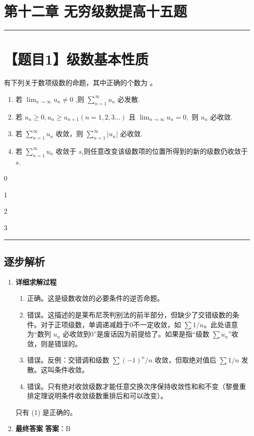 \documentclass[UTF8]{ctexart}
\newenvironment{redenv}{\color{red}}{}
\newenvironment{detailedanalysis}{%
    \color{red}
    \begin{enumerate}[label=\textbf{第\arabic*步：}, leftmargin=*, align=left, itemsep=1.5ex]
}{%
    \end{enumerate}
}
\newcommand{\problemrule}{\noindent\rule{\textwidth}{1.5pt}\vspace{-0.8em}}
\newcommand{\analysisrule}{\noindent\rule{\textwidth}{0.8pt}\vspace{-0.8em}}
\newcommand{\choicesFour}[4]{
    \begin{enumerate}[label=\Alph*., itemsep=0pt, parsep=0pt, topsep=5pt, labelsep=0.5em]
        \begin{minipage}{0.22\linewidth} \item #1 \end{minipage}
        \begin{minipage}{0.22\linewidth} \item #2 \end{minipage}
        \begin{minipage}{0.22\linewidth} \item #3 \end{minipage}
        \begin{minipage}{0.22\linewidth} \item #4 \end{minipage}
    \end{enumerate}
}
\newcommand{\blank}[1]{\underline{\hspace{#1}}}
\begin{document}
\section*{第十二章 无穷级数提高十五题}

\problemrule
\section*{【题目1】级数基本性质}
有下列关于数项级数的命题，其中正确的个数为 \blank{1cm}。
\begin{enumerate}[label=(\arabic*)]
    \item 若 $ \lim_{n\to\infty}u_{n}\neq0 $ ,则 $ \sum_{n=1}^{\infty}u_{n} $ 必发散.
    \item 若 $ u_{n}\geq0,u_{n}\geq u_{n+1}(n=1,2,3\ldots) $ 且 $ \lim_{n\to\infty}u_{n}=0, $ 则 $ u_{n} $ 必收敛.
    \item 若 $ \sum_{n=1}^{\infty}u_{n} $ 收敛，则 $ \sum_{n=1}^{\infty}|u_{n}| $ 必收敛.
    \item 若 $ \sum_{n=1}^{\infty}u_{n} $ 收敛于 $s$,则任意改变该级数项的位置所得到的新的级数仍收敛于 $s$.
\end{enumerate}
\choicesFour{0}{1}{2}{3}

\begin{redenv}
\analysisrule
\subsection*{逐步解析}

\begin{detailedanalysis}
\item \textbf{详细求解过程}
\begin{enumerate}[label=(\arabic*)]
    \item 正确。这是级数收敛的必要条件的逆否命题。
    \item 错误。这描述的是莱布尼茨判别法的前半部分，但缺少了交错级数的条件。对于正项级数，单调递减趋于0不一定收敛，如 $\sum 1/n$。此处语意为“数列 $u_n$ 必收敛到0”是废话因为前提给了。如果是指“级数 $\sum u_n$”收敛，则是错误的。
    \item 错误。反例：交错调和级数 $\sum (-1)^n/n$ 收敛，但取绝对值后 $\sum 1/n$ 发散。这叫条件收敛。
    \item 错误。只有绝对收敛级数才能任意交换次序保持收敛性和和不变（黎曼重排定理说明条件收敛级数重排后和可以改变）。
\end{enumerate}
只有 (1) 是正确的。

\item \textbf{最终答案}
\textbf{答案}：B
\end{detailedanalysis}
\end{redenv}
\end{document}
